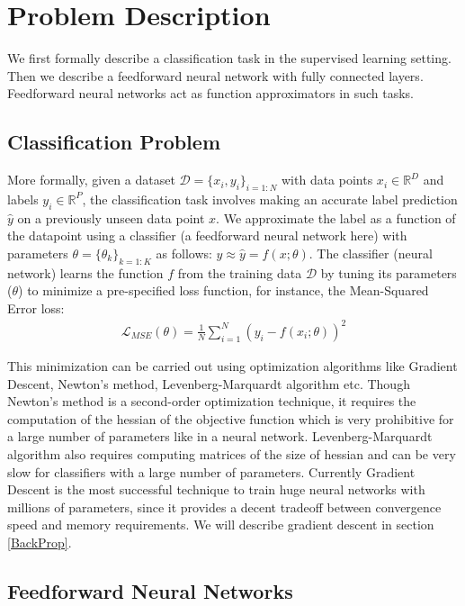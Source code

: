 \section{Problem Description}
\label{ProbDesc}

We first formally describe a classification task in the supervised learning setting. Then we describe a feedforward neural network with fully connected layers. Feedforward neural networks act as function approximators in such tasks.

\subsection{Classification Problem}
\label{ClassProb}

More formally, given a dataset $ \mathcal{D} = \{x_i,y_i\}_{i=1:N}$ with data points $x_i \in \mathbb{R}^D$ and labels $y_i \in \mathbb{R}^P$, the classification task involves making an accurate label prediction $\hat{y}$ on a previously unseen data point $x$. We approximate the label as a function of the datapoint using a classifier (a feedforward neural network here) with parameters $\theta = \{\theta_k\}_{k=1:K}$ as follows: $y \approx \hat{y} = f(x; \theta)$.
The classifier (neural network) learns the function $f$ from the training data $\mathcal{D}$ by tuning its parameters ($\theta$) to minimize a pre-specified loss function, for instance, the Mean-Squared Error loss:
\begin{align} \label{LMSE}
\mathcal{L}_{MSE} (\theta) = \frac{1}{N}\sum_{i=1}^N ( y_i - f(x_i; \theta))^2
\end{align}

This minimization can be carried out using optimization algorithms like Gradient Descent, Newton's method, Levenberg-Marquardt algorithm etc.
Though Newton's method is a second-order optimization technique, it requires the computation of the hessian of the objective function which is very prohibitive for a large number of parameters like in a neural network.
Levenberg-Marquardt algorithm also requires computing matrices of the size of hessian and can be very slow for classifiers with a large number of parameters.
Currently Gradient Descent is the most successful technique to train huge neural networks with millions of parameters, since it provides a decent tradeoff between convergence speed and memory requirements.
We will describe gradient descent in section \ref{BackProp}.

\subsection{Feedforward Neural Networks}
\label{FNN}

